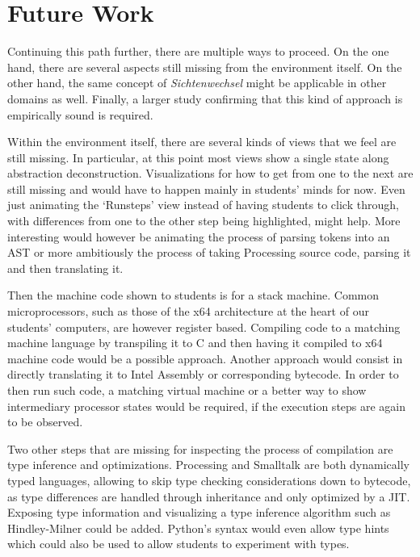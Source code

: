 \section{Future Work} \label{sc_future}

Continuing this path further, there are multiple ways to proceed. On the one hand, there are several aspects still missing from the environment itself. On the other hand, the same concept of \emph{Sichtenwechsel} might be applicable in other domains as well. Finally, a larger study confirming that this kind of approach is empirically sound is required.

Within the environment itself, there are several kinds of views that we feel are still missing. In particular, at this point most views show a single state along abstraction deconstruction. Visualizations for how to get from one to the next are still missing and would have to happen mainly in students' minds for now. Even just animating the `Runsteps' view instead of having students to click through, with differences from one to the other step being highlighted, might help. More interesting would however be animating the process of parsing tokens into an \ac{AST} or more ambitiously the process of taking Processing source code, parsing it and then translating it.

Then the machine code shown to students is for a stack machine. Common microprocessors, such as those of the x64 architecture at the heart of our students' computers, are however register based. Compiling code to a matching machine language by \eg transpiling it to C and then having it compiled to x64 machine code would be a possible approach. Another approach would consist in directly translating it to Intel Assembly or corresponding bytecode. In order to then run such code, a matching virtual machine or a better way to show intermediary processor states would be required, if the execution steps are again to be observed.

Two other steps that are missing for inspecting the process of compilation are type inference and optimizations. Processing and Smalltalk are both dynamically typed languages, allowing to skip type checking considerations down to bytecode, as type differences are handled through inheritance and only optimized by a \ac{JIT}. Exposing type information and visualizing a type inference algorithm such as Hindley-Milner could be added. Python's syntax would even allow type hints which could also be used to allow students to experiment with types.

